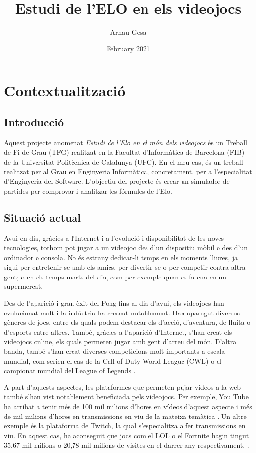 \documentclass[a4paper]{article}
\title{Estudi de l'ELO en els videojocs}
\author{Arnau Gesa }
\date{February 2021}
\begin{document}
\maketitle
\thispagestyle{empty}

\newpage

\setcounter{page}{1}

\tableofcontents

\newpage
\justify
\section{Contextualització}
\subsection{Introducció}
Aquest projecte anomenat \textit{Estudi de l'Elo en el món dels videojocs} és un Treball de Fi de Grau (TFG) realitzat en la Facultat d'Informàtica de Barcelona (FIB) de la Universitat Politècnica de Catalunya (UPC). En el meu cas, és un treball realitzat per al Grau en Enginyeria Informàtica, concretament, per a l'especialitat d'Enginyeria del Software. L'objectiu del projecte és crear un simulador de partides per comprovar i analitzar les fórmules de l'Elo.

\subsection{Situació actual}
Avui en dia, gràcies a l'Internet i a l'evolució i disponibilitat de les noves tecnologies, tothom pot jugar a un videojoc des d'un dispositiu mòbil o des d'un ordinador o consola. No és estrany dedicar-li temps en els moments lliures, ja sigui per entretenir-se amb els amics, per divertir-se o per competir contra altra gent; o en els temps morts del dia, com per exemple quan es fa cua en un supermercat. 

Des de l'aparició i gran èxit del Pong fins al dia d'avui, els videojocs han evolucionat molt i la indústria ha crescut notablement. Han aparegut diversos gèneres de jocs, entre els quals podem destacar els d'acció, d'aventura, de lluita o d'esports entre altres. També, gràcies a l'aparició d'Internet, s'han creat els videojocs online, els quals permeten jugar amb gent d'arreu del món. D'altra banda, també s'han creat diverses competicions molt importants a escala mundial, com serien el cas de la Call of Duty World League (CWL) o el campionat mundial del League of Legends \cite{importantCompetitions}.

A part d'aquests aspectes, les plataformes que permeten pujar vídeos a la web també \mbox{s'han} vist notablement beneficiada pels videojocs. Per exemple, You Tube ha arribat a tenir més de 100 mil milions d'hores en vídeos d'aquest aspecte i més de mil milions d'hores en transmissions en viu de la mateixa temàtica \cite{visitesYT}. Un altre exemple és la plataforma de Twitch, la qual s'especialitza a fer transmissions en viu. En aquest cas, ha aconseguit que jocs com el LOL o el Fortnite hagin tingut 35,67 mil milions o 20,78 mil milions de visites en el darrer any respectivament. \cite{visitesTwitch}.
\end{document}
